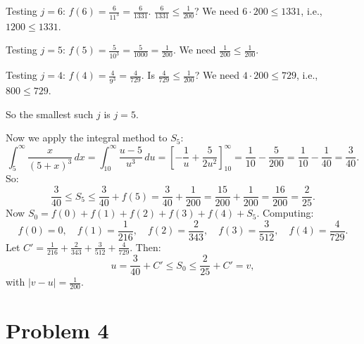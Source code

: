 \documentclass[11pt]{article}
\begin{document}
\begin{enumerate}[label=\textbf{(\alph*)}]
Testing $j = 6$: $f(6) = \frac{6}{11^3} = \frac{6}{1331}$. $\frac{6}{1331} \leq
\frac{1}{200}$? We need $6 \cdot 200 \leq 1331$, i.e., $1200 \leq 1331$. \checkmark

Testing $j = 5$: $f(5) = \frac{5}{10^3} = \frac{5}{1000} = \frac{1}{200}$. We need
$\frac{1}{200} \leq \frac{1}{200}$. \checkmark

Testing $j = 4$: $f(4) = \frac{4}{9^3} = \frac{4}{729}$. Is $\frac{4}{729} \leq
\frac{1}{200}$? We need $4 \cdot 200 \leq 729$, i.e., $800 \leq 729$. \texttimes

So the smallest such $j$ is $\boxed{j = 5}$.

Now we apply the integral method to $S_5$:
\[
    \int_5^{\infty} \frac{x}{(5+x)^3}\,dx = \int_{10}^{\infty}
    \frac{u-5}{u^3}\,du = \left[-\frac{1}{u} + \frac{5}{2u^2}\right]_{10}^{\infty}
    = \frac{1}{10} - \frac{5}{200} = \frac{1}{10} - \frac{1}{40} = \frac{3}{40}.
\]
So:
\[
    \frac{3}{40} \leq S_5 \leq \frac{3}{40} + f(5) = \frac{3}{40} + \frac{1}{200} =
    \frac{15}{200} + \frac{1}{200} = \frac{16}{200} = \frac{2}{25}.
\]
Now $S_0 = f(0) + f(1) + f(2) + f(3) + f(4) + S_5$. Computing:
\[
    f(0)=0,\quad f(1)=\frac{1}{216},\quad f(2)=\frac{2}{343},\quad
    f(3)=\frac{3}{512},\quad f(4)=\frac{4}{729}.
\]
Let $C' = \frac{1}{216} + \frac{2}{343} + \frac{3}{512} + \frac{4}{729}$. Then:
\[
    u = \frac{3}{40} + C' \leq S_0 \leq \frac{2}{25} + C' = v,
\]
with $|v - u| = \frac{1}{200}$. \checkmark

\end{enumerate}

\newpage

\section*{Problem 4}
\end{document}

